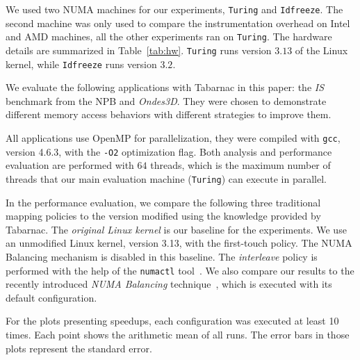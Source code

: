 We used two NUMA machines for our experiments, \texttt{Turing} and \texttt{Idfreeze}.
The second machine was only used to compare the instrumentation overhead on Intel and AMD machines, all the other experiments ran on \texttt{Turing}.
The hardware details are summarized in Table~\ref{tab:hw}.
\texttt{Turing} runs version $3.13$ of the Linux kernel, while \texttt{Idfreeze} runs version $3.2$.

We evaluate the following applications with \gls{Tabarnac} in this paper: the \emph{IS} benchmark from the \gls{NPB} and \emph{Ondes3D}.
They were chosen to demonstrate different memory access behaviors with different strategies to improve them.

All applications use OpenMP for parallelization, they were compiled with \texttt{gcc}, version 4.6.3, with the \texttt{-O2} optimization flag.
Both analysis and performance evaluation are performed with $64$ threads, which is the maximum number of threads that our main evaluation machine (\texttt{Turing}) can execute in parallel.

In the performance evaluation, we compare the following three traditional mapping policies to the version modified using the knowledge provided by \gls{Tabarnac}.
The \emph{original Linux kernel} is our baseline for the experiments. We use an unmodified Linux kernel, version 3.13, with the first-touch policy.
The NUMA Balancing mechanism is disabled in this baseline.
The \emph{interleave} policy is performed with the help of the \texttt{numactl} tool~\cite{Kleen05NUMA}.
We also compare our results to the recently introduced \emph{NUMA Balancing} technique~\cite{Corbet12Toward}, which is executed with its default configuration.

For the plots presenting speedups, each configuration was executed at least 10 times. Each point shows the arithmetic mean of all runs.
The error bars in those plots represent the standard error.

